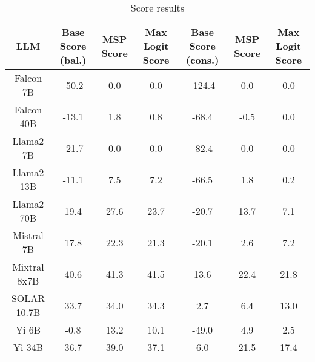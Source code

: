 \renewcommand\arraystretch{1.2}
\begin{table*}
\centering
\begin{tabular}{c|c|c|c|c|c|c}
LLM & Base Score (bal.) & MSP Score & Max Logit Score & Base Score (cons.) & MSP Score & Max Logit Score\\ \hline
Falcon 7B & -50.2 & 0.0 & 0.0 & -124.4 & 0.0 & 0.0\\
Falcon 40B & -13.1 & 1.8 & 0.8 & -68.4 & -0.5 & 0.0\\
Llama2 7B & -21.7 & 0.0 & 0.0 & -82.4 & 0.0 & 0.0\\
Llama2 13B & -11.1 & 7.5 & 7.2 & -66.5 & 1.8 & 0.2\\
Llama2 70B & 19.4 & 27.6 & 23.7 & -20.7 & 13.7 & 7.1\\
Mistral 7B & 17.8 & 22.3 & 21.3 & -20.1 & 2.6 & 7.2\\
Mixtral 8x7B & 40.6 & 41.3 & 41.5 & 13.6 & 22.4 & 21.8\\
SOLAR 10.7B & 33.7 & 34.0 & 34.3 & 2.7 & 6.4 & 13.0\\
Yi 6B & -0.8 & 13.2 & 10.1 & -49.0 & 4.9 & 2.5\\
Yi 34B & 36.7 & 39.0 & 37.1 & 6.0 & 21.5 & 17.4\\
\hline
\end{tabular}
\caption{Score results}
\end{table*}
\label{tab:score}
